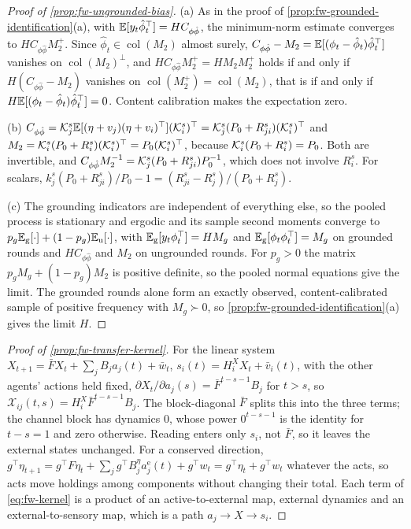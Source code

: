 \begin{proof}[Proof of \cref{prop:fw-ungrounded-bias}]
(a) As in the proof of \cref{prop:fw-grounded-identification}(a), with $\mathbb{E}[y_t\hat\phi_t^\top]=HC_{\phi\hat\phi}$, the minimum-norm estimate converges to $HC_{\phi\hat\phi}M_2^+$. Since $\hat\phi_t\in\operatorname{col}(M_2)$ almost surely, $C_{\phi\hat\phi}-M_2=\mathbb{E}[(\phi_t-\hat\phi_t)\hat\phi_t^\top]$ vanishes on $\operatorname{col}(M_2)^\perp$, and $HC_{\phi\hat\phi}M_2^+=HM_2M_2^+$ holds if and only if $H(C_{\phi\hat\phi}-M_2)$ vanishes on $\operatorname{col}(M_2^+)=\operatorname{col}(M_2)$, that is if and only if $H\mathbb{E}[(\phi_t-\hat\phi_t)\hat\phi_t^\top]=0$. Content calibration makes the expectation zero.

(b) $C_{\phi\hat\phi}=\mathcal{K}^s_j\mathbb{E}[(\eta+v_j)(\eta+v_i)^\top](\mathcal{K}^s_i)^\top=\mathcal{K}^s_j(P_0+R^s_{ji})(\mathcal{K}^s_i)^\top$ and $M_2=\mathcal{K}^s_i(P_0+R^s_i)(\mathcal{K}^s_i)^\top=P_0(\mathcal{K}^s_i)^\top$, because $\mathcal{K}^s_i(P_0+R^s_i)=P_0$. Both are invertible, and $C_{\phi\hat\phi}M_2^{-1}=\mathcal{K}^s_j(P_0+R^s_{ji})P_0^{-1}$, which does not involve $R^s_i$. For scalars, $k^s_j(P_0+R^s_{ji})/P_0-1=(R^s_{ji}-R^s_j)/(P_0+R^s_j)$.

(c) The grounding indicators are independent of everything else, so the pooled process is stationary and ergodic and its sample second moments converge to $p_g\mathbb{E}_{\mathrm g}[\cdot]+(1-p_g)\mathbb{E}_{\mathrm u}[\cdot]$, with $\mathbb{E}_{\mathrm g}[y_t\phi_t^\top]=HM_g$ and $\mathbb{E}_{\mathrm g}[\phi_t\phi_t^\top]=M_g$ on grounded rounds and $HC_{\phi\hat\phi}$ and $M_2$ on ungrounded rounds. For $p_g>0$ the matrix $p_gM_g+(1-p_g)M_2$ is positive definite, so the pooled normal equations give the limit. The grounded rounds alone form an exactly observed, content-calibrated sample of positive frequency with $M_g\succ0$, so \cref{prop:fw-grounded-identification}(a) gives the limit $H$.
\end{proof}

\begin{proof}[Proof of \cref{prop:fw-transfer-kernel}]
For the linear system $X_{t+1}=\bar FX_t+\sum_jB_ja_j(t)+\bar w_t$, $s_i(t)=H^X_iX_t+\bar v_i(t)$, with the other agents' actions held fixed, $\partial X_t/\partial a_j(s)=\bar F^{t-s-1}B_j$ for $t>s$, so $\mathcal X_{ij}(t,s)=H^X_i\bar F^{t-s-1}B_j$. The block-diagonal $\bar F$ splits this into the three terms; the channel block has dynamics $0$, whose power $0^{t-s-1}$ is the identity for $t-s=1$ and zero otherwise. Reading enters only $s_i$, not $\bar F$, so it leaves the external states unchanged. For a conserved direction, $g^\top\eta_{t+1}=g^\top F\eta_t+\sum_jg^\top B^\eta_ja^{\mathrm e}_j(t)+g^\top w_t=g^\top\eta_t+g^\top w_t$ whatever the acts, so acts move holdings among components without changing their total. Each term of \eqref{eq:fw-kernel} is a product of an active-to-external map, external dynamics and an external-to-sensory map, which is a path $a_j\to X\to s_i$.
\end{proof}

